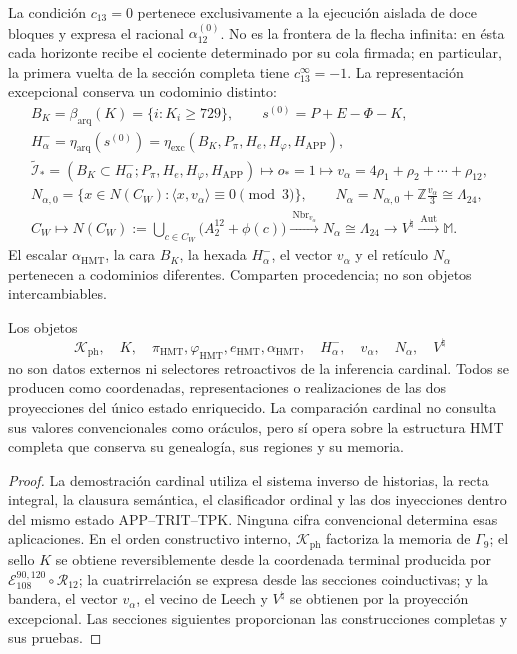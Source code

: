 La condición \(c_{13}=0\) pertenece exclusivamente a la ejecución aislada de
doce bloques y expresa el racional \(\alpha_{12}^{(0)}\). No es la frontera
de la flecha infinita: en ésta cada horizonte recibe el cociente determinado
por su cola firmada; en particular, la primera vuelta de la sección completa
tiene \(c_{13}^{\infty}=-1\).
La representación excepcional conserva un codominio distinto:
\[
 \begin{gathered}
 B_K=\beta_{\mathrm{arq}}(K)=\{i:K_i\ge729\},\qquad
 s^{(0)}=P+E-\Phi-K,\\
 H^-_\alpha=\eta_{\mathrm{arq}}(s^{(0)})
 =\eta_{\mathrm{exc}}(B_K,P_\pi,H_e,H_\varphi,H_{\mathrm{APP}}),\\
 \widetilde{\mathcal I}_*
 =(B_K\subset H^-_\alpha;P_\pi,H_e,H_\varphi,H_{\mathrm{APP}})
 \longmapsto o_*=1
 \longmapsto v_\alpha=4\rho_1+\rho_2+\cdots+\rho_{12},\\
 N_{\alpha,0}
 =\{x\in N(C_W):\langle x,v_\alpha\rangle\equiv0\pmod3\},\qquad
 N_\alpha=N_{\alpha,0}+\mathbb Z\frac{v_\alpha}{3}\cong\Lambda_{24},\\
 C_W\longmapsto
 N(C_W):=\bigcup_{c\in C_W}\bigl(A_2^{12}+\phi(c)\bigr)
 \xrightarrow{\ \operatorname{Nbr}_{v_\alpha}\ }
 N_\alpha\cong\Lambda_{24}
 \longrightarrow V^\natural
 \xrightarrow{\ \operatorname{Aut}\ }\mathbb M.
 \end{gathered}
\]
El escalar \(\alpha_{\mathrm{HMT}}\), la cara \(B_K\), la hexada
\(H^-_\alpha\), el vector \(v_\alpha\) y el retículo \(N_\alpha\) pertenecen
a codominios diferentes. Comparten procedencia; no son objetos intercambiables.

\begin{proposition}
\label{prop:posterioridad-testigos-ch}
Los objetos
\[
 \mathcal K_{\mathrm{ph}},\quad K,\quad
 \pi_{\mathrm{HMT}},\varphi_{\mathrm{HMT}},e_{\mathrm{HMT}},
 \alpha_{\mathrm{HMT}},\quad H^-_\alpha,\quad v_\alpha,\quad
 N_\alpha,\quad V^\natural
\]
no son datos externos ni selectores retroactivos de la inferencia cardinal.
Todos se producen como coordenadas, representaciones o realizaciones de las dos
proyecciones del único estado enriquecido. La comparación cardinal no consulta
sus valores convencionales como oráculos, pero sí opera sobre la estructura
HMT completa que conserva su genealogía, sus regiones y su memoria.
\end{proposition}

\begin{proof}
La demostración cardinal utiliza el sistema inverso de historias, la recta
integral, la clausura semántica, el clasificador ordinal y las dos inyecciones
dentro del mismo estado APP--TRIT--TPK. Ninguna cifra convencional determina
esas aplicaciones. En el orden constructivo interno,
\(\mathcal K_{\mathrm{ph}}\) factoriza la memoria de \(\Gamma_9\); el sello
\(K\) se obtiene reversiblemente desde la coordenada terminal producida por
\(\mathcal E_{108}^{90,120}\circ\mathcal R_{12}\); la
cuatrirrelación se expresa desde las secciones coinductivas; y la bandera, el
vector \(v_\alpha\), el vecino de Leech y \(V^\natural\) se obtienen por la
proyección excepcional. Las secciones siguientes proporcionan las
construcciones completas y sus pruebas.
\end{proof}

